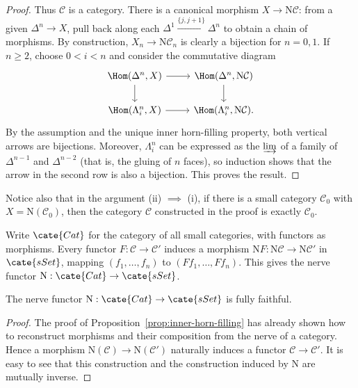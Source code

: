 \begin{proof}
	Thus $\mathcal{C}$ is a category. There is a canonical morphism
	$X\to\mathrm{N}\mathcal{C}$: from a given $\Delta^n\to X$, pull back
	along each $\Delta^1\xrightarrow{\{j,j+1\}}\Delta^n$ to obtain a chain of
	morphisms. By construction, $X_n\to\mathrm{N}\mathcal{C}_n$ is clearly a
	bijection for $n=0,1$. If $n\geq2$, choose $0<i<n$ and consider the
	commutative diagram
	\[\begin{tikzcd}
		\Hom(\Delta^n, X) \arrow[d] \arrow[r] & \Hom(\Delta^n, \mathrm{N}\mathcal{C}) \arrow[d] \\
		\Hom(\Lambda^n_i, X) \arrow[r] & \Hom(\Lambda^n_i, \mathrm{N}\mathcal{C}).
	\end{tikzcd}\]
	By the assumption and the unique inner horn-filling property, both vertical
	arrows are bijections. Moreover, $\Lambda^n_i$ can be expressed as the
	$\varinjlim$ of a family of $\Delta^{n-1}$ and $\Delta^{n-2}$ (that is,
	the gluing of $n$ faces), so induction shows that the arrow in the second
	row is also a bijection. This proves the result.
\end{proof}

Notice also that in the argument (ii) $\implies$ (i), if there is a small
category $\mathcal{C}_0$ with $X=\mathrm{N}(\mathcal{C}_0)$, then the
category $\mathcal{C}$ constructed in the proof is exactly
$\mathcal{C}_0$.

Write $\cate{Cat}$ for the category of all small categories, with functors as
morphisms. Every functor $F:\mathcal{C}\to\mathcal{C}'$ induces a morphism
$\mathrm{N}F:\mathrm{N}\mathcal{C}\to\mathrm{N}\mathcal{C}'$ in
$\cate{sSet}$, mapping $(f_1,\ldots,f_n)$ to
$(Ff_1,\ldots,Ff_n)$. This gives the nerve functor
$\mathrm{N}:\cate{Cat}\to\cate{sSet}$.

\begin{proposition}\label{prop:nerve-ff}
	The nerve functor $\mathrm{N}:\cate{Cat}\to\cate{sSet}$ is fully
	faithful.
\end{proposition}
\begin{proof}
	The proof of Proposition~\ref{prop:inner-horn-filling} has already shown
	how to reconstruct morphisms and their composition from the nerve of a
	category. Hence a morphism
	$\mathrm{N}(\mathcal{C})\to\mathrm{N}(\mathcal{C}')$ naturally induces a
	functor $\mathcal{C}\to\mathcal{C}'$. It is easy to see that this
	construction and the construction induced by $\mathrm{N}$ are mutually
	inverse.
\end{proof}


